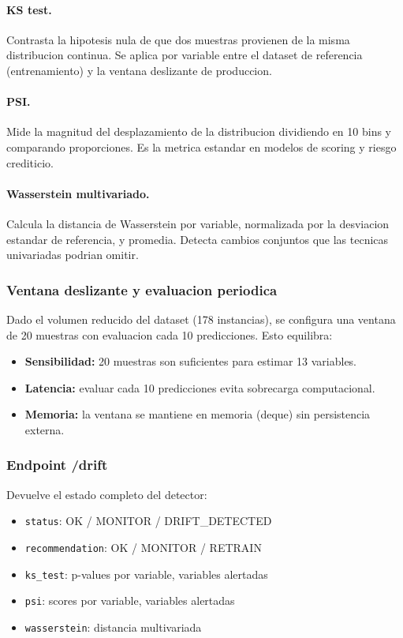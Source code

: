 \paragraph{KS test.} Contrasta la hipotesis nula de que dos muestras provienen de la misma distribucion continua. Se aplica por variable entre el dataset de referencia (entrenamiento) y la ventana deslizante de produccion.

\paragraph{PSI.} Mide la magnitud del desplazamiento de la distribucion dividiendo en 10 bins y comparando proporciones. Es la metrica estandar en modelos de scoring y riesgo crediticio.

\paragraph{Wasserstein multivariado.} Calcula la distancia de Wasserstein por variable, normalizada por la desviacion estandar de referencia, y promedia. Detecta cambios conjuntos que las tecnicas univariadas podrian omitir.

\subsubsection{Ventana deslizante y evaluacion periodica}

Dado el volumen reducido del dataset (178 instancias), se configura una ventana de 20 muestras con evaluacion cada 10 predicciones. Esto equilibra:

\begin{itemize}
    \item \textbf{Sensibilidad:} 20 muestras son suficientes para estimar 13 variables.
    \item \textbf{Latencia:} evaluar cada 10 predicciones evita sobrecarga computacional.
    \item \textbf{Memoria:} la ventana se mantiene en memoria (deque) sin persistencia externa.
\end{itemize}

\subsubsection{Endpoint /drift}

Devuelve el estado completo del detector:

\begin{itemize}
    \item \texttt{status}: OK / MONITOR / DRIFT\_DETECTED
    \item \texttt{recommendation}: OK / MONITOR / RETRAIN
    \item \texttt{ks\_test}: p-values por variable, variables alertadas
    \item \texttt{psi}: scores por variable, variables alertadas
    \item \texttt{wasserstein}: distancia multivariada
\end{itemize}

